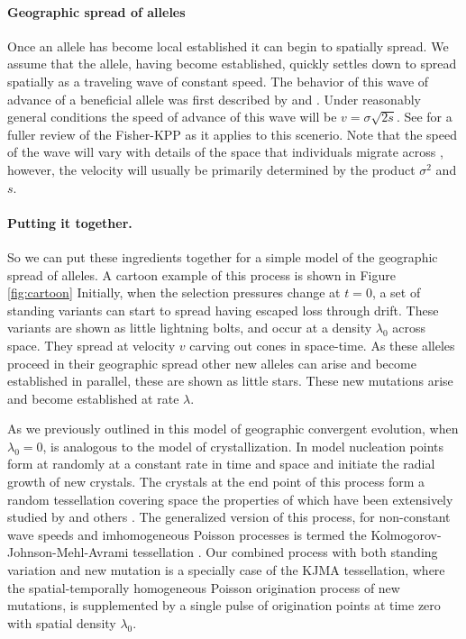 \documentclass{article}
\begin{document}
\paragraph{Geographic spread of alleles} 
Once an allele has become local established it can begin to spatially spread. 
We assume that the allele, having become established, quickly settles
down to spread spatially as a traveling wave of constant speed. The behavior of
this wave of advance of a beneficial allele was first described by 
\citet{fisher1937wave} and \citet*{KPP1937}. Under reasonably general
conditions the speed of advance
of this wave will be $v = \sigma \sqrt{2s}$. See
\citet{ralph2010parallel} for a fuller review of the Fisher-KPP as it
applies to this scenerio. Note that the speed of the wave will vary
with details of the space that individuals migrate across
\citep[e.g. see ][ for comparisons to migration on discrete
grids]{Slatkin-speed:76,SlatkinCharlesworth:78}, however, the velocity
will usually be primarily determined by the product $\sigma^2$ and $s$.

\paragraph{Putting it together.}
So we can put these ingredients together for a simple model of the
geographic spread of alleles. A cartoon example of this process is
shown in Figure \ref{fig:cartoon} Initially, when the selection
pressures change at $t=0$, a set of standing variants can start to
spread having escaped loss through drift. These variants are shown as
little lightning bolts, and occur at a density $\lambda_0$ across
space. They spread at velocity $v$ carving out cones in space-time. As these
alleles proceed in their geographic spread other new alleles can arise
and become established in parallel, these are shown as little
stars. These new mutations arise and become established at rate $\lambda$.

As we previously outlined in \citet{ralph2010parallel} this model of
geographic convergent evolution, when $\lambda_0=0$, is analogous to the \citet{kolmogorov-crystallization}
model of crystallization. In \citet{kolmogorov-crystallization} model nucleation points form at randomly at
a constant rate in time and space 
and initiate the radial growth of new crystals. The crystals at the
end point of this process form a random tessellation covering space
the properties of which have been extensively studied by \citet{moller92,moller95} and others \citep{bollobas-crystallization,gilbert-crystallization}. 
The generalized version of this process, for non-constant wave speeds
and imhomogeneous Poisson processes is termed the 
Kolmogorov-Johnson-Mehl-Avrami tessellation \citep[KJMA, see ][]{fanfoni-tomellini}.
Our combined process with both standing variation and new mutation is
a specially case of the KJMA tessellation, where the
spatial-temporally homogeneous
Poisson origination process of new mutations, is supplemented by a
single pulse of origination points at time zero with spatial density $\lambda_0$.
\end{document}
